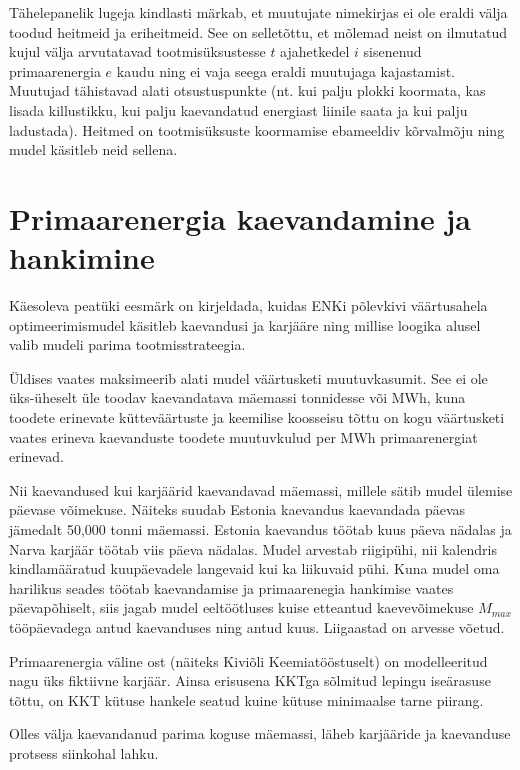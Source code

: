 \documentclass[10pt,a4paper]{article}
\begin{document}




Tähelepanelik lugeja kindlasti märkab, et muutujate nimekirjas ei ole eraldi välja toodud heitmeid ja eriheitmeid. See on selletõttu, et mõlemad neist on ilmutatud kujul välja arvutatavad tootmisüksustesse $t$ ajahetkedel $i$ sisenenud primaarenergia $e$ kaudu ning ei vaja seega eraldi muutujaga kajastamist. Muutujad tähistavad alati otsustuspunkte (nt. kui palju plokki koormata, kas lisada killustikku, kui palju kaevandatud energiast liinile saata ja kui palju ladustada). Heitmed on tootmisüksuste koormamise ebameeldiv kõrvalmõju ning mudel käsitleb neid sellena.

\section{Primaarenergia kaevandamine ja hankimine}

Käesoleva peatüki eesmärk on kirjeldada, kuidas ENKi põlevkivi väärtusah\-ela optimeerimismudel käsitleb kaevandusi ja karjääre ning millise loogika alusel valib mudeli parima tootmisstrateegia.

Üldises vaates maksimeerib alati mudel väärtusketi muutuvkasumit. See ei ole üks-üheselt üle toodav kaevandatava mäemassi tonnidesse või MWh, kuna toodete erinevate kütteväärtuste ja keemilise koosseisu  tõttu on kogu väärtusketi vaates erineva kaevanduste toodete muutuvkulud per MWh primaarenergiat erinevad.

Nii kaevandused kui karjäärid kaevandavad mäemassi, millele sätib mudel ülemise päevase võimekuse. Näiteks suudab Estonia kaevandus kaevandada päe\-vas jämedalt 50,000 tonni mäemassi. Estonia kaevandus töötab kuus päeva nädalas ja Narva karjäär töötab viis päeva nädalas. Mudel arvestab riigipühi, nii kalendris kindlamääratud kuupäevadele langevaid kui ka liikuvaid pühi. Kuna mudel oma harilikus seades töötab kaevandamise ja primaarenegia hankimise vaates päevapõhiselt, siis jagab mudel eeltöötluses kuise etteantud kaevevõimekuse $\mathit{M}_{max}$ tööpäevadega antud kaevanduses ning antud kuus. Liigaastad on arvesse võetud.

Primaarenergia väline ost (näiteks Kiviõli Keemiatööstuselt) on modelleeritud nagu üks fiktiivne karjäär. Ainsa erisusena KKTga sõlmitud lepingu iseära\-suse tõttu, on KKT kütuse hankele seatud kuine kütuse minimaalse tarne piirang. 

Olles välja kaevandanud parima koguse mäemassi, läheb karjääride ja kaevanduse protsess siinkohal lahku.
\end{document}
